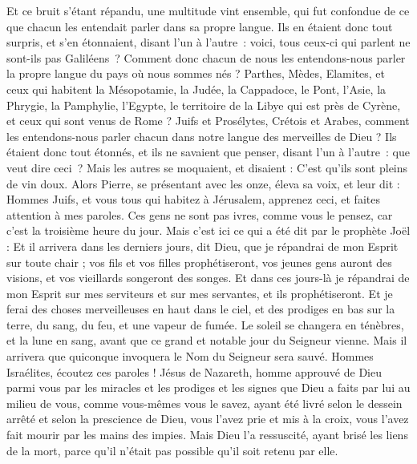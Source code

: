 \begin{multicols}{2}
Et ce bruit s'étant répandu, une multitude vint ensemble, qui fut confondue de ce que chacun les entendait parler dans sa propre langue. 
Ils en étaient donc tout surpris, et s’en étonnaient, disant l’un à l’autre : voici, tous ceux-ci qui parlent ne sont-ils pas Galiléens ?
Comment donc chacun de nous les entendons-nous parler la propre langue du pays où nous sommes nés ? 
Parthes, Mèdes, Elamites, et ceux qui habitent la Mésopotamie, la Judée, la Cappadoce, le Pont, l’Asie,
la Phrygie, la Pamphylie, l’Egypte, le territoire de la Libye qui est près de Cyrène, et ceux qui sont venus de Rome ?
Juifs et Prosélytes, Crétois et Arabes, comment les entendons-nous parler chacun dans notre langue des merveilles de Dieu ?
Ils étaient donc tout étonnés, et ils ne savaient que penser, disant l’un à l’autre : que veut dire ceci ?
Mais les autres se moquaient, et disaient : C’est qu'ils sont pleins de vin doux.
Alors Pierre, se présentant avec les onze, éleva sa voix, et leur dit : Hommes Juifs, et vous tous qui habitez à Jérusalem, apprenez ceci, et faites attention à mes paroles.
Ces gens ne sont pas ivres, comme vous le pensez, car c'est la troisième heure du jour.
Mais c'est ici ce qui a été dit par le prophète Joël :
Et il arrivera dans les derniers jours, dit Dieu, que je répandrai de mon Esprit sur toute chair ; vos fils et vos filles prophétiseront, vos jeunes gens auront des visions, et vos vieillards songeront des songes.
Et dans ces jours-là je répandrai de mon Esprit sur mes serviteurs et sur mes servantes, et ils prophétiseront.
Et je ferai des choses merveilleuses en haut dans le ciel, et des prodiges en bas sur la terre, du sang, du feu, et une vapeur de fumée.
Le soleil se changera en ténèbres, et la lune en sang, avant que ce grand et notable jour du Seigneur vienne.
Mais il arrivera que quiconque invoquera le Nom du Seigneur sera sauvé.
Hommes Israélites, écoutez ces paroles ! Jésus de Nazareth, homme approuvé de Dieu parmi vous par les miracles et les prodiges et les signes que Dieu a faits par lui au milieu de vous, comme vous-mêmes vous le savez,
ayant été livré selon le dessein arrêté et selon la prescience de Dieu, vous l'avez prie et mis à la croix, vous l’avez fait mourir par les mains des impies.
Mais Dieu l'a ressuscité, ayant brisé les liens de la mort, parce qu'il n'était pas possible qu'il soit retenu par elle.

\end{multicols}
